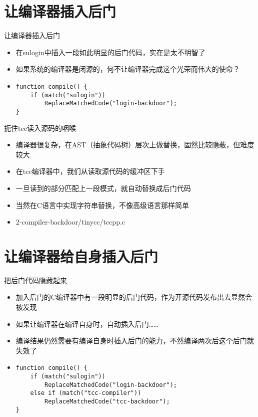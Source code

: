 \documentclass{beamer}
\begin{document}
\section{让编译器插入后门}

\begin{frame}[fragile]{让编译器插入后门}
\begin{itemize}
  \item 在sulogin中插入一段如此明显的后门代码，实在是太不明智了
  \item 如果系统的编译器是闭源的，何不让编译器完成这个光荣而伟大的使命？
  \item {
\begin{verbatim}
function compile() {
    if (match("sulogin"))
        ReplaceMatchedCode("login-backdoor");
}
\end{verbatim}
  }
\end{itemize}
\end{frame}

\begin{frame}{扼住tcc读入源码的咽喉}
\begin{itemize}
  \item 编译器很复杂，在AST（抽象代码树）层次上做替换，固然比较隐蔽，但难度较大
  \item 在tcc编译器中，我们从读取源代码的缓冲区下手
  \item 一旦读到的部分匹配上一段模式，就自动替换成后门代码
  \item 当然在C语言中实现字符串替换，不像高级语言那样简单
  \item 2-compiler-backdoor/tinycc/tccpp.c
\end{itemize}
\end{frame}

\section{让编译器给自身插入后门}

\begin{frame}[fragile]{把后门代码隐藏起来}
\begin{itemize}
  \item 加入后门的C编译器中有一段明显的后门代码，作为开源代码发布出去显然会被发现
  \item 如果让编译器在编译自身时，自动插入后门……
  \item 编译结果仍然需要有编译自身时插入后门的能力，不然编译两次后这个后门就失效了
  \item {
\begin{verbatim}
function compile() {
    if (match("sulogin"))
        ReplaceMatchedCode("login-backdoor");
    else if (match("tcc-compiler"))
        ReplaceMatchedCode("tcc-backdoor");
}
\end{verbatim}
  }
\end{itemize}
\end{frame}
\end{document}
